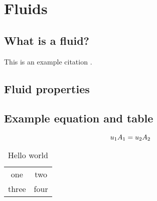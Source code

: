 
\chapter{Fluids}
\label{ch:fluids}


\section{What is a fluid?}
This is an example citation \citep{Janeway:2392}.

\section{Fluid properties}

\section{Example equation and table}

\begin{equation}
u_1 A_1 = u_2 A_2
\label{eq:continuity}
\index{equation!continuity}
\end{equation}

\begin{table}
\caption{Hello world}
\begin{center}
\begin{tabular}{cc}
one & two \\
three & four \\
\end{tabular}
\end{center}
\end{table}



